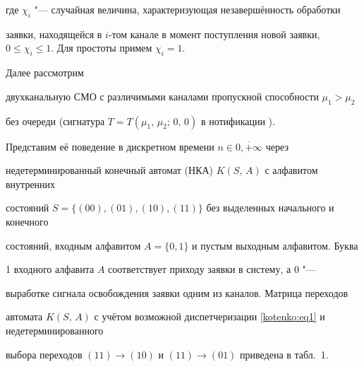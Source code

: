 где $\chi_i$ "--- случайная величина, характеризующая незавершённость обработки

заявки, находящейся в $i$-том канале в момент поступления новой заявки, $0\le

\chi_i\le 1$. Для простоты примем $\chi_i=1$.



\smallskip



 Далее рассмотрим

двухканальную СМО с различимыми каналами пропускной способности $\mu _1 > \mu_2$

без очереди (сигнатура $T=T(\mu_1,\,\mu_2;\,0,\,0)$ в нотификации \cite{kotenko:bib1,kotenko:bib2}).

Представим её поведение в дискретном времени $n \in \overline{ 0, +\infty}  $ через

недетерминированный конечный автомат (НКА) $K(S,\,A)$ с алфавитом внутренних

состояний $S=\{(00),(01),(10),(11)\}$ без выделенных начального и конечного

состояний, входным алфавитом $A=\{0,1\}$ и пустым выходным алфавитом. Буква

1 входного алфавита $A$ соответствует приходу заявки в систему, а 0 "---

выработке сигнала освобождения заявки одним из каналов. Матрица переходов

автомата $K(S,\,A)$ с учётом возможной диспетчеризации \eqref{kotenko:eq1} и недетерминированного

выбора переходов $(11)\to (10)$ и $(11)\to (01)$ приведена в табл.~1.





